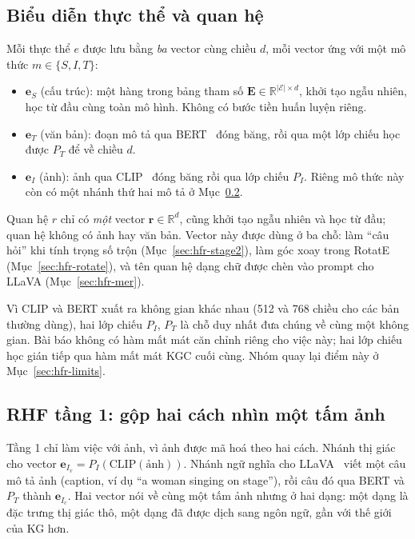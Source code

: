 \documentclass[conference,a4paper]{IEEEtran}
\begin{document}
\subsection{Biểu diễn thực thể và quan hệ}
\label{sec:hfr-encode}

Mỗi thực thể $e$ được lưu bằng \emph{ba} vector cùng chiều $d$, mỗi vector ứng với một mô thức $m \in \{S, I, T\}$:

\begin{itemize}
\item $\mathbf{e}_S$ (cấu trúc): một hàng trong bảng tham số $\mathbf{E} \in \mathbb{R}^{|\mathcal{E}| \times d}$, khởi tạo ngẫu nhiên, học từ đầu cùng toàn mô hình. Không có bước tiền huấn luyện riêng.
\item $\mathbf{e}_T$ (văn bản): đoạn mô tả qua BERT~\cite{bert} đóng băng, rồi qua một lớp chiếu học được $P_T$ để về chiều $d$.
\item $\mathbf{e}_I$ (ảnh): ảnh qua CLIP~\cite{clip} đóng băng rồi qua lớp chiếu $P_I$. Riêng mô thức này còn có một nhánh thứ hai mô tả ở Mục~\ref{sec:hfr-stage1}.
\end{itemize}

Quan hệ $r$ chỉ có \emph{một} vector $\mathbf{r} \in \mathbb{R}^d$, cũng khởi tạo ngẫu nhiên và học từ đầu; quan hệ không có ảnh hay văn bản. Vector này được dùng ở ba chỗ: làm ``câu hỏi'' khi tính trọng số trộn (Mục~\ref{sec:hfr-stage2}), làm góc xoay trong RotatE (Mục~\ref{sec:hfr-rotate}), và tên quan hệ dạng chữ được chèn vào prompt cho LLaVA (Mục~\ref{sec:hfr-mer}).

Vì CLIP và BERT xuất ra không gian khác nhau (512 và 768 chiều cho các bản thường dùng), hai lớp chiếu $P_I$, $P_T$ là chỗ duy nhất đưa chúng về cùng một không gian. Bài báo không có hàm mất mát căn chỉnh riêng cho việc này; hai lớp chiếu học gián tiếp qua hàm mất mát KGC cuối cùng. Nhóm quay lại điểm này ở Mục~\ref{sec:hfr-limits}.

\subsection{RHF tầng 1: gộp hai cách nhìn một tấm ảnh}
\label{sec:hfr-stage1}

Tầng 1 chỉ làm việc với ảnh, vì ảnh được mã hoá theo hai cách. Nhánh thị giác cho vector $\mathbf{e}_{I_v} = P_I(\mathrm{CLIP}(\text{ảnh}))$. Nhánh ngữ nghĩa cho LLaVA~\cite{llava} viết một câu mô tả ảnh (caption, ví dụ ``a woman singing on stage''), rồi câu đó qua BERT và $P_T$ thành $\mathbf{e}_{I_c}$. Hai vector nói về cùng một tấm ảnh nhưng ở hai dạng: một dạng là đặc trưng thị giác thô, một dạng đã được dịch sang ngôn ngữ, gần với thế giới của KG hơn.
\end{document}
